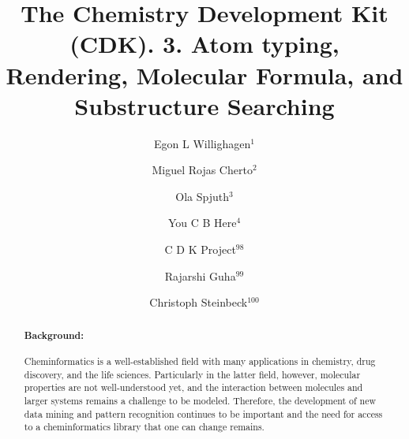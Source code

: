 \documentclass[10pt]{bmc_article}
\newenvironment{bmcformat}{\begin{raggedright}\baselineskip20pt\sloppy\setboolean{publ}{false}}{\end{raggedright}\baselineskip20pt\sloppy}
\begin{document}
\begin{bmcformat}

\title{The Chemistry Development Kit (CDK). 3. Atom typing, Rendering, Molecular Formula, and Substructure Searching}
 
\author{
  Egon L Willighagen$^{1}$%
\and
  Miguel Rojas Cherto$^2$%
\and
  Ola Spjuth$^3$%
\and
  You C B Here$^4$%
\and
  C D K Project\correspondingauthor$^98$%
\and
  Rajarshi Guha$^{99}$%
\and
  Christoph Steinbeck$^{100}$%
}
      
\address{
    \iid(1)Division of Molecular Toxicology, Institute of Environmental Medicine, Karolinska Institutet, SE-17177 Stockholm, Sweden\\
    \iid(2)Division of Analytical Biosciences, Leiden/Amsterdam Center for Drug Research, Leiden, The Netherlands \\
    \iid(3)Example Ltd., Glasgow, UK \\
    \iid(98)\url{http://cdk.sourceforge.net/} \\
    \iid(99)NIH Center for Translational Therapeutics, 9800 Medical Center Drive, Rockville, MD 20878, USA \\
    \iid(100)Chemoinformatics and Metabolism team, European Bioinformatics Institute, Hinxton, UK 
}

\maketitle


\begin{abstract}
\paragraph*{Background:}
Cheminformatics is a well-established field with many applications in chemistry,
drug discovery, and the life sciences. Particularly in the latter field, however,
molecular properties are not well-understood yet, and the interaction between
molecules and larger systems remains a challenge to be modeled. Therefore, the
development of new data mining and pattern recognition continues to be important
and the need for access to a cheminformatics library that one can change remains.

\end{abstract}
\end{bmcformat}
\end{document}

